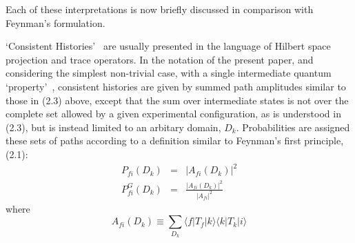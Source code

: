 \documentclass [12pt]{article}
\begin{document}
{     Each of these interpretations is now briefly discussed in comparison with Feynman's
     formulation.
    \par `Consistent Histories'~\cite{Griffiths,Omnes,GMH} are usually presented in the language
   of Hilbert space projection and trace operators. In the notation of the present paper, and 
   considering the simplest non-trivial case, with a single intermediate quantum `property'~\cite{Omnes},
   consistent histories are given by summed path amplitudes similar to those in
    (2.3) above, except that the sum over intermediate states is not over the complete set
    allowed by a given experimental configuration, as is understood in (2.3), but is instead
   limited to an arbitary domain, $D_k$. Probabilities are assigned these sets of paths 
   according to a definition similar to Feynman's first principle, (2.1):
   \begin{eqnarray}
    P_{fi}(D_k) & = & |A_{fi}(D_k)|^2 \\
     P_{fi}^G (D_k) & = & \frac{|A_{fi}(D_k)|^2}{|A_{fi}|^2} 
  \end{eqnarray}
   where 
 \begin{equation}
 A_{fi}(D_k) \equiv \sum_{D_k} \langle f|T_f|k\rangle \langle k |T_k|i\rangle 
  \end{equation}

}
\end{document}
